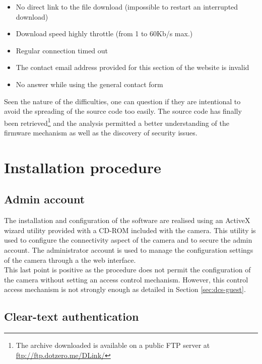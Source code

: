 \begin{itemize}
\item No direct link to the file download (impossible to restart an interrupted download)
\item Download speed highly throttle (from 1 to 60Kb/s max.)
\item Regular connection timed out
\item The contact email address provided for this section of the website is invalid
\item No answer while using the general contact form
\end{itemize}

Seen the nature of the difficulties, one can question if they are intentional to avoid the spreading of the source code too easily.
The source code has finally been retrieved\footnote{The archive downloaded is available on a public FTP server at \url{ftp://ftp.dotzero.me/DLink/}} and the analysis permitted a better understanding of the firmware mechanism as well as the discovery of security issues.

\section{Installation procedure}
\label{sec:dcs-install}

\subsection{Admin account}

The installation and configuration of the software are realised using an ActiveX wizard utility provided with a CD-ROM included with the camera.
This utility is used to configure the connectivity aspect of the camera and to secure the admin account.
The administrator account is used to manage the configuration settings of the camera through a the web interface.\\

This last point is positive as the procedure does not permit the configuration of the camera without setting an access control mechanism.
However, this control access mechanism is not strongly enough as detailed in Section \ref{sec:dcs-guest}.

\subsection{Clear-text authentication}
\label{sec:dcs-clearauth}

